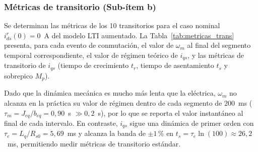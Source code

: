 \documentclass[12pt, a4paper,journal, onecolumn, compsoc]{IEEEtran}
\begin{document}
\subsubsection{Métricas de transitorio (Sub-ítem b)}
\label{sec:sim_item_b}

Se determinan las métricas de los 10 transitorios para el caso nominal $i_{ds}^r(0) = 0$~A del modelo LTI aumentado. La Tabla~\ref{tab:metricas_trans} presenta, para cada evento de conmutación, el valor de $\omega_m$ al final del segmento temporal correspondiente, el valor de régimen teórico de $i_{qs}$, y las métricas de transitorio de $i_{qs}$ (tiempo de crecimiento $t_r$, tiempo de asentamiento $t_s$ y sobrepico $M_p$).

Dado que la dinámica mecánica es mucho más lenta que la eléctrica, $\omega_m$ no alcanza en la práctica su valor de régimen dentro de cada segmento de 200~ms ($\tau_m = J_{eq}/b_{eq} = 0{,}90$~s $\gg 0{,}2$~s), por lo que se reporta el valor instantáneo al final de cada intervalo. En contraste, $i_{qs}$ sigue una dinámica de primer orden con $\tau_e = L_q/R_{s0} = 5{,}69$~ms y alcanza la banda de $\pm 1\,\%$ en $t_s = \tau_e \ln(100) \approx 26{,}2$~ms, permitiendo medir métricas de transitorio estándar.
\end{document}
